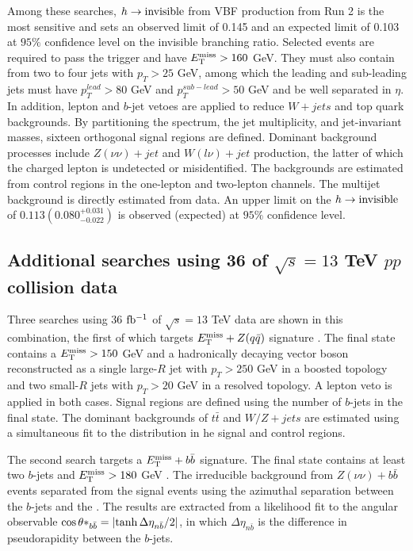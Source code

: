 Among these searches, $h\rightarrow \mathrm{invisible}$ from VBF production from Run 2 is the most sensitive and sets an observed limit of 0.145 and an expected limit of 0.103 at $95\%$ confidence level on the invisible branching ratio. Selected events are required to pass the \met trigger and have $E_{\mathrm{T}}^{\mathrm{miss}}>160$ GeV. They must also contain from two to four jets with $p_T>25$ GeV, among which the leading and sub-leading jets must have $p_T^{lead}>80$ GeV and $p_T^{sub-lead}>50$ GeV and be well separated in $\eta$. In addition, lepton and $b$-jet vetoes are applied to reduce $W+jets$ and top quark backgrounds. By partitioning the \met spectrum, the jet multiplicity, and jet-invariant masses, sixteen orthogonal signal regions are defined. Dominant background processes include $Z(\nu\nu)+jet$ and $W(l\nu)+jet$ production, the latter of which the charged lepton is undetected or misidentified. The backgrounds are estimated from control regions in the one-lepton and two-lepton channels. The multijet background is directly estimated from data. An upper limit on the $h\rightarrow \mathrm{invisible}$ of $0.113\left(0.080^{+0.031}_{-0.022} \right)$ is observed (expected) at $95\%$ confidence level. 

\subsection{Additional searches using 36 \texorpdfstring{\ifb}{TEXT} of \texorpdfstring{$\sqrt{s}=13$}{TEXT} TeV \texorpdfstring{$pp$}{TEXT} collision data}

Three searches using 36 $\mbox{fb\(^{-1}\)}$ of $\sqrt{s}=13$ TeV data are shown in this combination, the first of which targets $E_{\mathrm{T}}^{\mathrm{miss}} + Z(q\bar{q})$ signature \cite{EXOT-2016-23}. The final state contains a $E_{\mathrm{T}}^{\mathrm{miss}}>150$ GeV and a hadronically decaying vector boson reconstructed as a single large-$R$ jet with $p_T>250$ GeV in a boosted topology and two small-$R$ jets with $p_T>20$ GeV in a resolved topology. A lepton veto is applied in both cases. Signal regions are defined using the number of $b$-jets in the final state. The dominant backgrounds of $t\bar{t}$ and $W/Z+jets$ are estimated using a simultaneous fit to the \met distribution in he signal and control regions.

The second search targets a $E_{\mathrm{T}}^{\mathrm{miss}}+b\bar{b}$ signature. The final state contains at least two $b$-jets and $E_{\mathrm{T}}^{\mathrm{miss}}>180$ GeV \cite{SUSY-2016-18}. The irreducible background from $Z(\nu\nu)+b\bar{b}$ events separated from the signal events using the azimuthal separation between the $b$-jets and the \met. The results are extracted from a likelihood fit to the angular observable $\cos\theta*_{b\bar{b}} = \abs{\tanh\Delta\eta_{n\bar{b}}/2}$, in which $\Delta\eta_{n\bar{b}}$ is the difference in pseudorapidity between the $b$-jets.

